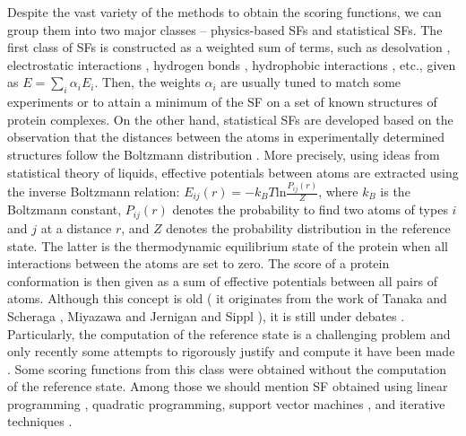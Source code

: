 Despite the vast variety of the methods to obtain the scoring functions, we can group
them into two major classes -- physics-based SFs and statistical
SFs. The first class of SFs is constructed as a weighted sum of terms,  such as desolvation \cite{Wang2003}, electrostatic interactions
\cite{Sheinerman2002}, hydrogen bonds \cite{Fernandez2003},
hydrophobic interactions \cite{Scarsi1999}, etc., given as  $E=\sum_{i}\alpha_{i}E_{i}$. Then,
the weights $\alpha_{i}$ are usually tuned to match some experiments
or to attain a minimum of the SF on a set of known structures of protein complexes. 
%
On the other hand,
statistical
SFs are developed based on the observation that the distances
between the atoms in experimentally determined structures follow the Boltzmann distribution \cite{finkelstein2004protein}.
%
More precisely, using ideas from statistical theory of liquids, effective potentials between
atoms are extracted using the inverse Boltzmann relation: $E_{ij}(r)=-k_{B}T\mbox{ln}\frac{P_{ij}(r)}{Z}$,
where $k_{B}$ is the Boltzmann constant, $P_{ij}(r)$ denotes the
probability to find two atoms of types $i$ and $j$ at a distance
$r$, and $Z$ denotes the probability distribution in the reference state. The latter is the thermodynamic equilibrium state of the protein when all
interactions between the atoms are set to zero. 
%
The score of a protein conformation is then given as a sum of effective potentials between
all pairs of atoms. Although this concept is old ( it originates from
the work of Tanaka and Scheraga \cite{Tanaka1976}, Miyazawa and Jernigan \cite{miyazawa1985estimation} and Sippl  \cite{sippl1990calculation} ),
it is still under
debates \cite{Thomas1996,Sippl1996,Sippl1997,ben1997statistical}. 
Particularly, the computation of the reference state is a challenging problem and only recently some
attempts to rigorously justify and compute it have been made \cite{Hamelryck2010}. Some scoring functions from this class were obtained without the computation of the 
reference state. Among those we should mention SF obtained using linear programming \cite{Tobi2000,Tobi2006,Vendruscolo2000},
quadratic programming, support vector machines \cite{Bernauer2007,Hu2004,Martin2008}, and iterative techniques \cite{Huang2008,Huang2010}.

